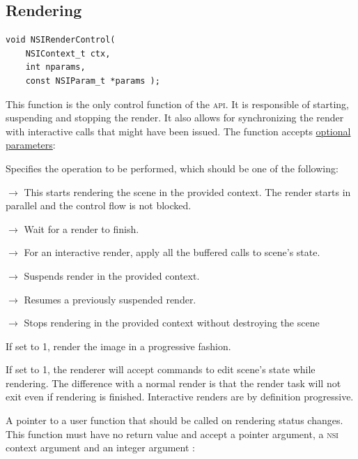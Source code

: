 \documentclass[oneside,ebook]{memoir}
\newcommand*{\acronym}[1]{\textsc{\lowercase{#1}}}
\newcommand{\paramlistitemTN}[2]{\item[#2\textcolor{lightgray}{\dotfill}#1]}
\newcommand{\paramlistitemTND}[3]{\paramlistitemTN{#1 {\rmfamily({\ttfamily#3})}}{#2}}
\newcommand{\paramvalueitem}[1]{\item[#1]$\rightarrow$}
\begin{document}
\subsection{Rendering}
\label{section:rendering}
\begin{lstlisting}[style=CAPI]
void NSIRenderControl(
	NSIContext_t ctx,
	int nparams,
	const NSIParam_t *params );
\end{lstlisting}
This function is the only control function of the \acronym{API}.
It is responsible of starting, suspending and stopping the render.
It also allows for synchronizing the render with interactive calls that might have been issued.
The function accepts \hyperref[CAPI:optionalparam]{optional parameters}:
\begin{paramlist}
\paramlistitemTN{string}{action}
Specifies the operation to be performed, which should be one of the following:
\begin{paramvaluelist}
\paramvalueitem{start}
This starts rendering the scene in the provided context. The render starts in parallel and the control flow is not blocked.
\paramvalueitem{wait}
Wait for a render to finish.
\paramvalueitem{synchronize}
For an interactive render, apply all the buffered calls to scene's state.
\paramvalueitem{suspend}
Suspends render in the provided context.
\paramvalueitem{resume}
Resumes a previously suspended render.
\paramvalueitem{stop}
Stops rendering in the provided context without destroying the scene
\end{paramvaluelist}
\paramlistitemTND{int}{progressive}{0}
If set to 1, render the image in a progressive fashion.
\paramlistitemTND{int}{interactive}{0}\label{interactive render}
If set to 1, the renderer will accept commands to edit scene's state while rendering. The difference with a normal render is that the render task will not exit even if rendering is finished. Interactive renders are by definition progressive.
\paramlistitemTN{pointer}{stoppedcallback}
A pointer to a user function that should be called on rendering status changes.
This function must have no return value and accept a pointer argument, a \acronym{NSI} context argument and an integer argument :

\end{paramlist}
\end{document}
